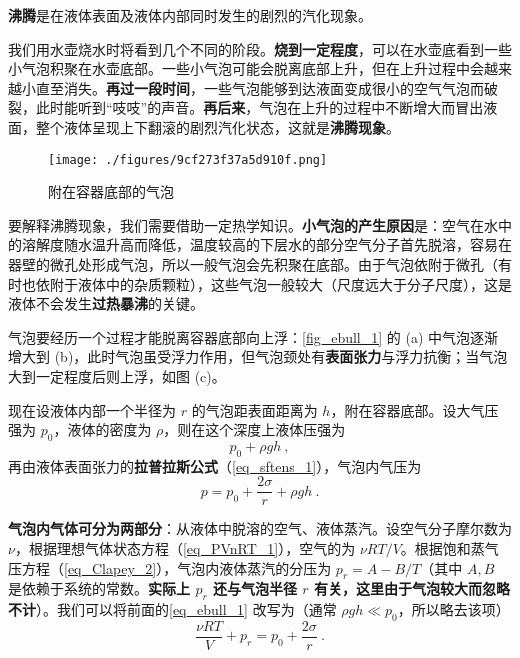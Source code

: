
\textbf{沸腾}是在液体表面及液体内部同时发生的剧烈的汽化现象。

我们用水壶烧水时将看到几个不同的阶段。\textbf{烧到一定程度}，可以在水壶底看到一些小气泡积聚在水壶底部。一些小气泡可能会脱离底部上升，但在上升过程中会越来越小直至消失。\textbf{再过一段时间}，一些气泡能够到达液面变成很小的空气气泡而破裂，此时能听到“吱吱”的声音。\textbf{再后来}，气泡在上升的过程中不断增大而冒出液面，整个液体呈现上下翻滚的剧烈汽化状态，这就是\textbf{沸腾现象}。
\begin{figure}[ht]
\centering
\texttt{[image: ./figures/9cf273f37a5d910f.png]}
\caption{附在容器底部的气泡} \label{fig_ebull_1}
\end{figure}
要解释沸腾现象，我们需要借助一定热学知识。\textbf{小气泡的产生原因}是：空气在水中的溶解度随水温升高而降低，温度较高的下层水的部分空气分子首先脱溶，容易在器壁的微孔处形成气泡，所以一般气泡会先积聚在底部。由于气泡依附于微孔（有时也依附于液体中的杂质颗粒），这些气泡一般较大（尺度远大于分子尺度），这是液体不会发生\textbf{过热暴沸}的关键。

气泡要经历一个过程才能脱离容器底部向上浮：\autoref{fig_ebull_1} 的 (a) 中气泡逐渐增大到 (b)，此时气泡虽受浮力作用，但气泡颈处有\textbf{表面张力}与浮力抗衡；当气泡大到一定程度后则上浮，如图 (c)。

现在设液体内部一个半径为 $r$ 的气泡距表面距离为 $h$，附在容器底部。设大气压强为 $p_0$，液体的密度为 $\rho$，则在这个深度上液体压强为
\begin{equation}
p_0+\rho gh ~,
\end{equation}
再由液体表面张力的\textbf{拉普拉斯公式}（\autoref{eq_sftens_1}），气泡内气压为
\begin{equation}\label{eq_ebull_1}
p=p_0+\frac{2\sigma}{r}+\rho gh~.
\end{equation}

\textbf{气泡内气体可分为两部分}：从液体中脱溶的空气、液体蒸汽。设空气分子摩尔数为 $\nu$，根据理想气体状态方程（\autoref{eq_PVnRT_1}），空气的为 $\nu RT/V$。根据饱和蒸气压方程（\autoref{eq_Clapey_2}），气泡内液体蒸汽的分压为 $p_r=A-B/T$（其中 $A,B$ 是依赖于系统的常数。\textbf{实际上 $p_r$ 还与气泡半径 $r$ 有关，这里由于气泡较大而忽略不计}）。我们可以将前面的\autoref{eq_ebull_1} 改写为（通常 $\rho gh\ll p_0$，所以略去该项）
\begin{equation}\label{eq_ebull_2}
\frac{\nu RT}{V}+p_r=p_0+\frac{2\sigma}{r}~.
\end{equation}

